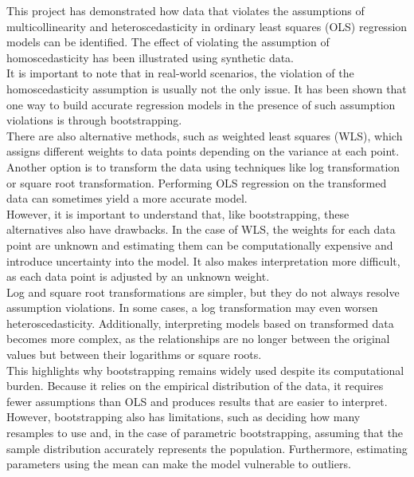 This project has demonstrated how data that violates the assumptions of multicollinearity and heteroscedasticity in ordinary least squares (OLS) regression models can be identified. The effect of violating the assumption of homoscedasticity has been illustrated using synthetic data.
\\
It is important to note that in real-world scenarios, the violation of the homoscedasticity assumption is usually not the only issue. It has been shown that one way to build accurate regression models in the presence of such assumption violations is through bootstrapping.
\\
There are also alternative methods, such as weighted least squares (WLS), which assigns different weights to data points depending on the variance at each point. Another option is to transform the data using techniques like log transformation or square root transformation. Performing OLS regression on the transformed data can sometimes yield a more accurate model.
\\
However, it is important to understand that, like bootstrapping, these alternatives also have drawbacks. In the case of WLS, the weights for each data point are unknown and estimating them can be computationally expensive and introduce uncertainty into the model. It also makes interpretation more difficult, as each data point is adjusted by an unknown weight.
\\
Log and square root transformations are simpler, but they do not always resolve assumption violations. In some cases, a log transformation may even worsen heteroscedasticity. Additionally, interpreting models based on transformed data becomes more complex, as the relationships are no longer between the original values but between their logarithms or square roots.
\\
This highlights why bootstrapping remains widely used despite its computational burden. Because it relies on the empirical distribution of the data, it requires fewer assumptions than OLS and produces results that are easier to interpret. However, bootstrapping also has limitations, such as deciding how many resamples to use and, in the case of parametric bootstrapping, assuming that the sample distribution accurately represents the population. Furthermore, estimating parameters using the mean can make the model vulnerable to outliers.

